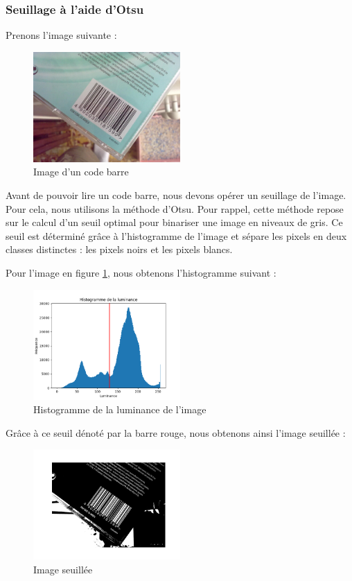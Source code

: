 \documentclass{rapport}
\begin{document}
\subsubsection*{Seuillage à l'aide d'Otsu}
Prenons l'image suivante :
\begin{figure}[H] %
	\centering
	\includegraphics[width=0.5\textwidth]{images/barcode0.jpg}
	\caption{Image d'un code barre}
	\label{code_barre}
\end{figure}

Avant de pouvoir lire un code barre, nous devons opérer un seuillage de l'image. Pour cela, nous utilisons la méthode d'Otsu.
Pour rappel, cette méthode repose sur le calcul d'un seuil optimal pour binariser une image en niveaux de gris.
Ce seuil est déterminé grâce à l'histogramme de l'image et sépare les pixels en deux classes distinctes : les pixels noirs et les pixels blancs.

Pour l'image en figure \ref{code_barre}, nous obtenons l'histogramme suivant :

\begin{figure}[H] 
	\centering
	\includegraphics[width=0.5\textwidth]{images/histogramme.png}
	\caption{Histogramme de la luminance de l'image}
	\label{histogramme}
\end{figure}

Grâce à ce seuil dénoté par la barre rouge, nous obtenons ainsi l'image seuillée : 
\begin{figure}[H] 
	\centering
	\includegraphics[width=0.5\textwidth]{images/barcode_seuillee.png}
	\caption{Image seuillée}
	\label{img_seuillee}
\end{figure}
\end{document}
